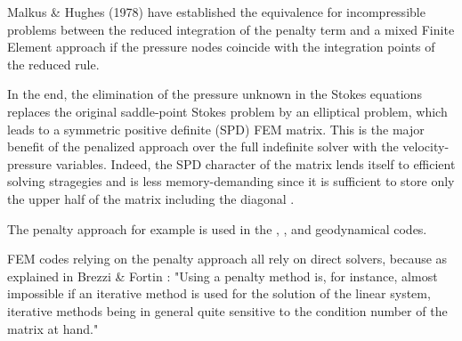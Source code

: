 Malkus \& Hughes (1978) \cite{mahu78} have established the equivalence 
for incompressible problems between the reduced integration
of the penalty term and a mixed Finite Element approach if the pressure nodes coincide 
with the integration points of the reduced rule.

In the end, the elimination of the pressure unknown in the Stokes equations
replaces the original saddle-point Stokes problem \cite{begl05} by an elliptical problem, 
which leads to a symmetric positive definite (SPD) FEM matrix. 
This is the major benefit of the penalized approach 
over the full indefinite solver with the velocity-pressure variables. 
Indeed, the SPD character of the matrix lends itself 
to efficient solving stragegies and is less memory-demanding since it is sufficient to 
store only the upper half of the matrix including the diagonal \cite{gova}.

The penalty approach for example is used in the \sopale, \douar, \fantom and \elefant geodynamical 
codes. 

\begin{remark}
FEM codes relying on the penalty approach all rely on direct solvers, because as explained in 
Brezzi \& Fortin \cite{brfo}: "Using a penalty method is, for instance, almost impossible if an iterative
method is used for the solution of the linear system, iterative methods
being in general quite sensitive to the condition number of the matrix at hand."
\end{remark}



